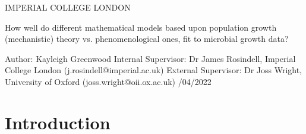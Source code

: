 \documentclass[11pt, a4paper, titlepage]{article}
\begin{document}
    \begin{titlepage}
    \begin{center}
            {\large IMPERIAL COLLEGE LONDON}
    \end{center}
    
    \vspace*{\fill}
    
    \begin{center}
        {\Huge How well do different mathematical models based upon population growth (mechanistic) theory vs. phenomenological ones, fit to microbial growth data?}
    
        \bigskip
        Author: Kayleigh Greenwood 
        \newline
        Internal Supervisor: Dr James Rosindell, Imperial College London (j.rosindell@imperial.ac.uk)
        \newline
        External Supervisor: Dr Joss Wright, University of Oxford (joss.wright@oii.ox.ac.uk)
        /04/2022

    \end{center}
    
    \vspace{\fill}
    
    \end{titlepage}

    \section*{Introduction}
    
\end{document}
